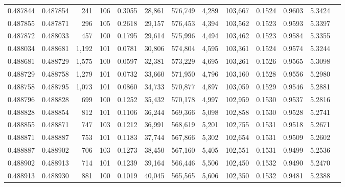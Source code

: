 \begin{tabular}{rrrrrrrrrrrrr}
0.487844 & 0.487854 &   241 & 106 &                                     0.3055 &  28,861 & 576,749 &   4,289 & 103,667 & 0.1524 & 0.9603 & 5.3424 \\
0.487855 & 0.487871 &   296 & 105 &                                     0.2618 &  29,157 & 576,453 &   4,394 & 103,562 & 0.1523 & 0.9593 & 5.3397 \\
0.487872 & 0.488033 &   457 & 100 &                                     0.1795 &  29,614 & 575,996 &   4,494 & 103,462 & 0.1523 & 0.9584 & 5.3355 \\
0.488034 & 0.488681 & 1,192 & 101 &                                     0.0781 &  30,806 & 574,804 &   4,595 & 103,361 & 0.1524 & 0.9574 & 5.3244 \\
0.488681 & 0.488729 & 1,575 & 100 &                                     0.0597 &  32,381 & 573,229 &   4,695 & 103,261 & 0.1526 & 0.9565 & 5.3098 \\
0.488729 & 0.488758 & 1,279 & 101 &                                     0.0732 &  33,660 & 571,950 &   4,796 & 103,160 & 0.1528 & 0.9556 & 5.2980 \\
0.488758 & 0.488795 & 1,073 & 101 &                                     0.0860 &  34,733 & 570,877 &   4,897 & 103,059 & 0.1529 & 0.9546 & 5.2881 \\
0.488796 & 0.488828 &   699 & 100 &                                     0.1252 &  35,432 & 570,178 &   4,997 & 102,959 & 0.1530 & 0.9537 & 5.2816 \\
0.488828 & 0.488854 &   812 & 101 &                                     0.1106 &  36,244 & 569,366 &   5,098 & 102,858 & 0.1530 & 0.9528 & 5.2741 \\
0.488855 & 0.488871 &   747 & 103 &                                     0.1212 &  36,991 & 568,619 &   5,201 & 102,755 & 0.1531 & 0.9518 & 5.2671 \\
0.488871 & 0.488887 &   753 & 101 &                                     0.1183 &  37,744 & 567,866 &   5,302 & 102,654 & 0.1531 & 0.9509 & 5.2602 \\
0.488887 & 0.488902 &   706 & 103 &                                     0.1273 &  38,450 & 567,160 &   5,405 & 102,551 & 0.1531 & 0.9499 & 5.2536 \\
0.488902 & 0.488913 &   714 & 101 &                                     0.1239 &  39,164 & 566,446 &   5,506 & 102,450 & 0.1532 & 0.9490 & 5.2470 \\
0.488913 & 0.488930 &   881 & 100 &                                     0.1019 &  40,045 & 565,565 &   5,606 & 102,350 & 0.1532 & 0.9481 & 5.2388 \\

\end{tabular}
